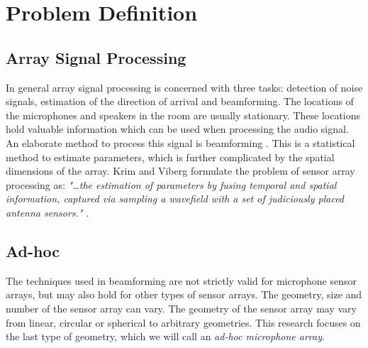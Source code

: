 \chapter{Problem Definition}
\label{chap:problem}

\section{Array Signal Processing}
\label{sec:problem_array}
In general array signal processing is concerned with three tasks: detection of noise signals, estimation of the direction of arrival and beamforming. The locations of the microphones and speakers in the room are usually stationary. These locations hold valuable information which can be used when processing the audio signal. An elaborate method to process this signal is beamforming \cite{lui2010}. This is a statistical method to estimate parameters, which is further complicated by the spatial dimensions of the array. Krim and Viberg formulate the problem of sensor array processing as: \textit{"\dots the estimation of parameters by fusing temporal and spatial information, captured via sampling a wavefield with a set of judiciously placed antenna sensors."} \cite{krim1996}.

\section{Ad-hoc}
\label{sec:problem_ad-hoc}
The techniques used in beamforming are not strictly valid for microphone sensor arrays, but may also hold for other types of sensor arrays. The geometry, size and number of the sensor array can vary. The geometry of the sensor array may vary from linear, circular or spherical to arbitrary geometries. This research focuses on the last type of geometry, which we will call an \textit{ad-hoc microphone array}.

